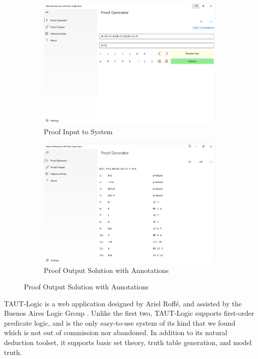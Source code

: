 \documentclass[ms]{uncgdissertationexp2}
\theoremstyle{plain}
\theoremstyle{definition}
\theoremstyle{remark}
\begin{document}
\begin{figure}[!ht]
	\centering
	\caption{NaturalDeduction Windows Application Solving a Proof}
	\label{fig:test}
	\begin{subfigure}{.5\textwidth}
		\centering
		\includegraphics[width=0.9\linewidth]{w10app-1.png}
		\caption{Proof Input to System}
		\label{fig:sub1}
	\end{subfigure}%
	\begin{subfigure}{.5\textwidth}
		\centering
		\includegraphics[width=0.9\linewidth]{w10app-2.png}
		\caption{Proof Output Solution with Annotations}
		\label{fig:sub2}
	\end{subfigure}
\end{figure}

TAUT-Logic is a web application designed by Ariel Roff\'e, and assisted by the Buenos Aires Logic Group \cite{taut}. Unlike the first two, TAUT-Logic supports first-order predicate logic, and is the only easy-to-use system of its kind that we found which is not out of commission nor abandoned. In addition to its natural deduction toolset, it supports basic set theory,  truth table generation, and model truth. 
\end{document}

